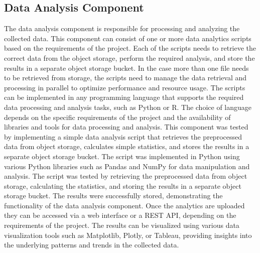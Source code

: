 \subsection{Data Analysis Component}
The data analysis component is responsible for processing and analyzing the collected data. This component can consist of one or more data analytics scripts based on the requirements of the project. Each of the scripts needs to retrieve the correct data from the object storage, perform the required analysis, and store the results in a separate object storage bucket. In the case more than one file needs to be retrieved from storage, the scripts need to manage the data retrieval and processing in parallel to optimize performance and resource usage. The scripts can be implemented in any programming language that supports the required data processing and analysis tasks, such as Python or R. The choice of language depends on the specific requirements of the project and the availability of libraries and tools for data processing and analysis.
This component was tested by implementing a simple data analysis script that retrieves the preprocessed data from object storage, calculates simple statistics, and stores the results in a separate object storage bucket. The script was implemented in Python using various Python libraries such as Pandas and NumPy for data manipulation and analysis. The script was tested by retrieving the preprocessed data from object storage, calculating the statistics, and storing the results in a separate object storage bucket. The results were successfully stored, demonstrating the functionality of the data analysis component.
Once the analytics are uploaded they can be accessed via a web interface or a REST API, depending on the requirements of the project. The results can be visualized using various data visualization tools such as Matplotlib, Plotly, or Tableau, providing insights into the underlying patterns and trends in the collected data.